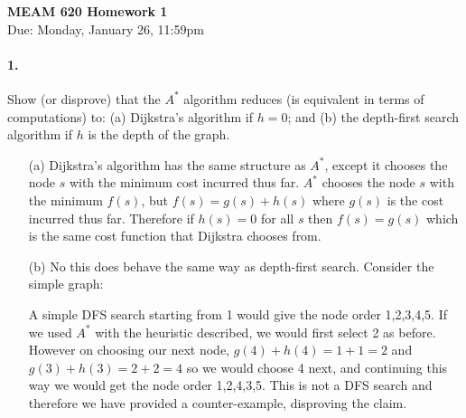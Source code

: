 \documentclass[english]{article}
\begin{document}
\begin{center}
{\textbf{MEAM 620 Homework 1}} \\
Due: Monday, January 26, 11:59pm 
\end{center}






\paragraph{1.}

Show (or disprove) that the $A^*$ algorithm reduces (is equivalent in terms of computations) to: 
(a) Dijkstra's algorithm if $h=0$; and (b) the depth-first search algorithm if $h$ is the depth of the graph. 

\begin{enumerate}
\item[(a)] Dijkstra's algorithm has the same structure as $A^*$, except it chooses the node $s$ with the minimum cost incurred thus far. $A^*$ chooses the node $s$ with the minimum $f(s)$, but $f(s) = g(s) + h(s)$ where $g(s)$ is the cost incurred thus far. Therefore if $h(s) = 0$ for all $s$ then $f(s) = g(s)$ which is the same cost function that Dijkstra chooses from.
\item[(b)] No this does behave the same way as depth-first search. Consider the simple graph: 


A simple DFS search starting from 1 would give the node order 1,2,3,4,5. If we used $A^{*}$ with the heuristic described, we would first select 2 as before. However on choosing our next node, $g(4) + h(4) = 1 + 1 = 2$ and $g(3) + h(3) = 2 + 2 = 4$ so we would choose 4 next, and continuing this way we would get the node order 1,2,4,3,5. This is not a DFS search and therefore we have provided a counter-example, disproving the claim.

\end{enumerate}
\end{document}
